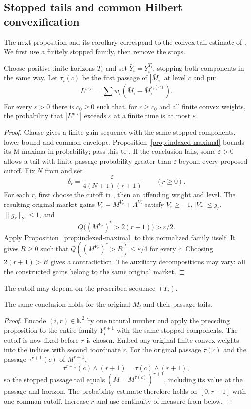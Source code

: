 \subsection{Stopped tails and common Hilbert convexification}
The next proposition and its corollary correspond to the convex-tail estimate of \cite[Lemma 4.8]{DS}. We first use a finitely stopped family, then remove the stops.

\begin{proposition}\label{prop:convex-tails}
Choose positive finite horizons $T_i$ and set $\bar Y_i=Y_i^{T_i}$, stopping
both components in the same way. Let $\tau_i(c)$ be the first passage of
$|\bar M_i|$ at level $c$ and put
\[
 L^{w,c}=\sum_iw_i(\bar M_i-\bar M_i^{\tau_i(c)}).
\]
For every $\varepsilon>0$ there is $c_0\geq0$ such that, for $c\geq c_0$ and
all finite convex weights, the probability that $|L^{w,c}|$ exceeds
$\varepsilon$ at a finite time is at most $\varepsilon$.
\end{proposition}
\begin{proof}
Clause  gives a finite-gain sequence with the same stopped components, lower bound and common envelope.
Proposition~\ref{prop:indexed-maximal} bounds its M maxima in probability; pass this to .
If the conclusion fails, some $\varepsilon>0$ allows a tail with finite-passage
probability greater than $\varepsilon$ beyond every proposed cutoff.
Fix $N$ from  and set
\[
 \delta_r=\frac{\varepsilon}{4(N+1)(r+1)}\qquad(r\geq0).
\]
For each $r$, first choose  the cutoff in , then an offending weight and level.
The resulting original-market gains $V_r=M^{V_r}+A^{V_r}$ satisfy
$V_r\geq-1$, $|V_r|\leq g_r$, $\|g_r\|_2\leq1$, and
\[
 Q\bigl((M^{V_r})^*>2(r+1)\bigr)>\varepsilon/2.
\]
Apply Proposition~\ref{prop:indexed-maximal} to this normalized family itself.
It gives $R\geq0$ such that $Q((M^{V_r})^*>R)\leq\varepsilon/4$ for every $r$.
Choosing $2(r+1)>R$ gives a contradiction.
The auxiliary decompositions may vary: all the constructed gains belong to
the same original market.
\end{proof}
The cutoff may depend on the prescribed sequence $(T_i)$.
\begin{corollary}
The same conclusion holds for the original $M_i$ and their passage tails.
\end{corollary}
\begin{proof}
Encode $(i,r)\in\mathbb N^2$ by one natural number and apply the preceding
proposition to the entire family $Y_i^{r+1}$ with the same stopped components.
The cutoff is now fixed before $r$ is chosen. Embed any original finite
convex weights into the indices with second coordinate $r$.
For the original passage $\tau(c)$ and the passage $\tau^{r+1}(c)$ of $M^{r+1}$,
\[
 \tau^{r+1}(c)\wedge(r+1)=\tau(c)\wedge(r+1),
\]
so the stopped passage tail equals $(M-M^{\tau(c)})^{r+1}$, including its value
at the passage and horizon. The probability estimate therefore holds on
$[0,r+1]$ with one common cutoff. Increase $r$ and use continuity of measure
from below.
\end{proof}
